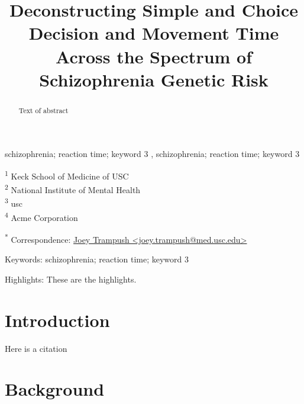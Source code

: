 \documentclass[
  number]{elsarticle}
\begin{document}
\begin{frontmatter}
\title{Deconstructing Simple and Choice Decision and Movement Time
Across the Spectrum of Schizophrenia Genetic Risk}


        
\begin{abstract}
Text of abstract
\end{abstract}





\begin{keyword}
    schizophrenia; reaction time; keyword 3 \sep 
    schizophrenia; reaction time; keyword 3
\end{keyword}
\end{frontmatter}
    \ifdefined\Shaded\renewenvironment{Shaded}{\begin{tcolorbox}[breakable, enhanced, frame hidden, borderline west={3pt}{0pt}{shadecolor}, interior hidden, boxrule=0pt, sharp corners]}{\end{tcolorbox}}\fi

\textsuperscript{1} Keck School of Medicine of USC\\
\textsuperscript{2} National Institute of Mental Health\\
\textsuperscript{3} usc\\
\textsuperscript{4} Acme Corporation

\textsuperscript{*} Correspondence:
\href{mailto:joey.trampush@med.usc.edu}{Joey Trampush
\textless{}joey.trampush@med.usc.edu\textgreater{}}

Keywords: schizophrenia; reaction time; keyword 3

Highlights: These are the highlights.

\hypertarget{introduction}{%
\section{Introduction}\label{introduction}}

Here is a citation \citep{Marwick2017}

\hypertarget{background}{%
\section{Background}\label{background}}
\end{document}
